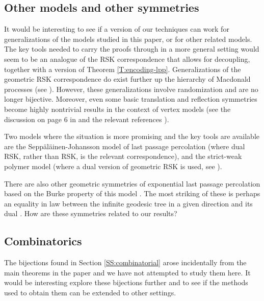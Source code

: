 \documentclass[aop, preprint]{imsart}
\theoremstyle{plain}
\theoremstyle{definition}
\theoremstyle{plain}
\begin{document}
\subsection*{Other models and other symmetries}

It would be interesting to see if a version of our techniques can work for generalizations of the models studied in this paper, or for other related models. The key tools needed to carry the proofs through in a more general setting would seem to be an analogue of the RSK correspondence that allows for decoupling, together with a version of Theorem \ref{T:encoding-lpp}. Generalizations of the geometric RSK correspondence do exist further up the hierarchy of Macdonald processes (see \citep{borodin2016nearest, matveev2015q, pei2016q, bufetov2018hall}). However, these generalizations involve randomization and are no longer bijective. Moreover, even some basic translation and reflection symmetries become highly nontrivial results in the context of vertex models (see the discussion on page 6 in \citep{borodin2019shift} and the relevant references \citep{borodin2018coloured, borodin2019color}).

Two models where the situation is more promising and the key tools are available are the Sepp\"al\"ainen-Johansson model \citep{seppalainen1998exact, johansson2001discrete} of last passage percolation (where dual RSK, rather than RSK, is the relevant correspondence), and the strict-weak polymer model (where a dual version of geometric RSK is used, see \citep{o2015tracy, corwin2015strict}).

There are also other geometric symmetries of exponential last passage percolation based on the Burke property of this model \citep{cator2012busemann, pimentel2016duality}. The most striking of these is perhaps an equality in law between the infinite geodesic tree in a given direction and its dual \citep{pimentel2016duality}. How are these symmetries related to our results?

\subsection*{Combinatorics}

The bijections found in Section \ref{SS:combinatorial} arose incidentally from the main theorems in the paper and we have not attempted to study them here. It would be interesting explore these bijections further and to see if the methods used to obtain them can be extended to other settings.
\end{document}
